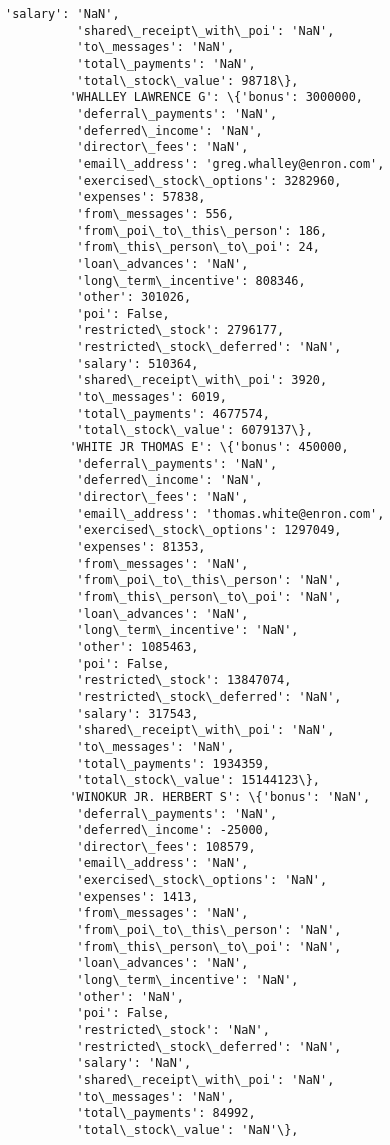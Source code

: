 \documentclass[11pt]{article}
\begin{document}
\begin{Verbatim}[commandchars=\\\{\}]
          'salary': 'NaN',
          'shared\_receipt\_with\_poi': 'NaN',
          'to\_messages': 'NaN',
          'total\_payments': 'NaN',
          'total\_stock\_value': 98718\},
         'WHALLEY LAWRENCE G': \{'bonus': 3000000,
          'deferral\_payments': 'NaN',
          'deferred\_income': 'NaN',
          'director\_fees': 'NaN',
          'email\_address': 'greg.whalley@enron.com',
          'exercised\_stock\_options': 3282960,
          'expenses': 57838,
          'from\_messages': 556,
          'from\_poi\_to\_this\_person': 186,
          'from\_this\_person\_to\_poi': 24,
          'loan\_advances': 'NaN',
          'long\_term\_incentive': 808346,
          'other': 301026,
          'poi': False,
          'restricted\_stock': 2796177,
          'restricted\_stock\_deferred': 'NaN',
          'salary': 510364,
          'shared\_receipt\_with\_poi': 3920,
          'to\_messages': 6019,
          'total\_payments': 4677574,
          'total\_stock\_value': 6079137\},
         'WHITE JR THOMAS E': \{'bonus': 450000,
          'deferral\_payments': 'NaN',
          'deferred\_income': 'NaN',
          'director\_fees': 'NaN',
          'email\_address': 'thomas.white@enron.com',
          'exercised\_stock\_options': 1297049,
          'expenses': 81353,
          'from\_messages': 'NaN',
          'from\_poi\_to\_this\_person': 'NaN',
          'from\_this\_person\_to\_poi': 'NaN',
          'loan\_advances': 'NaN',
          'long\_term\_incentive': 'NaN',
          'other': 1085463,
          'poi': False,
          'restricted\_stock': 13847074,
          'restricted\_stock\_deferred': 'NaN',
          'salary': 317543,
          'shared\_receipt\_with\_poi': 'NaN',
          'to\_messages': 'NaN',
          'total\_payments': 1934359,
          'total\_stock\_value': 15144123\},
         'WINOKUR JR. HERBERT S': \{'bonus': 'NaN',
          'deferral\_payments': 'NaN',
          'deferred\_income': -25000,
          'director\_fees': 108579,
          'email\_address': 'NaN',
          'exercised\_stock\_options': 'NaN',
          'expenses': 1413,
          'from\_messages': 'NaN',
          'from\_poi\_to\_this\_person': 'NaN',
          'from\_this\_person\_to\_poi': 'NaN',
          'loan\_advances': 'NaN',
          'long\_term\_incentive': 'NaN',
          'other': 'NaN',
          'poi': False,
          'restricted\_stock': 'NaN',
          'restricted\_stock\_deferred': 'NaN',
          'salary': 'NaN',
          'shared\_receipt\_with\_poi': 'NaN',
          'to\_messages': 'NaN',
          'total\_payments': 84992,
          'total\_stock\_value': 'NaN'\},

\end{Verbatim}
\end{document}
